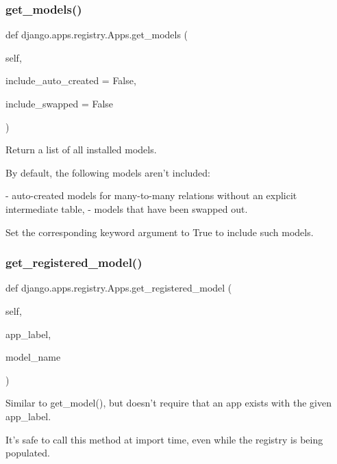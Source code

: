 \subsubsection{\texorpdfstring{get\+\_\+models()}{get\_models()}}
{\footnotesize\ttfamily def django.\+apps.\+registry.\+Apps.\+get\+\_\+models (\begin{DoxyParamCaption}\item[{}]{self,  }\item[{}]{include\+\_\+auto\+\_\+created = {\ttfamily False},  }\item[{}]{include\+\_\+swapped = {\ttfamily False} }\end{DoxyParamCaption})}

\begin{DoxyVerb}Return a list of all installed models.

By default, the following models aren't included:

- auto-created models for many-to-many relations without
  an explicit intermediate table,
- models that have been swapped out.

Set the corresponding keyword argument to True to include such models.
\end{DoxyVerb}
 \mbox{\label{classdjango_1_1apps_1_1registry_1_1_apps_a1f7538579bf34258180bf6ec39e3ad40}} 
\subsubsection{\texorpdfstring{get\+\_\+registered\+\_\+model()}{get\_registered\_model()}}
{\footnotesize\ttfamily def django.\+apps.\+registry.\+Apps.\+get\+\_\+registered\+\_\+model (\begin{DoxyParamCaption}\item[{}]{self,  }\item[{}]{app\+\_\+label,  }\item[{}]{model\+\_\+name }\end{DoxyParamCaption})}

\begin{DoxyVerb}Similar to get_model(), but doesn't require that an app exists with
the given app_label.

It's safe to call this method at import time, even while the registry
is being populated.
\end{DoxyVerb}
 \mbox{\label{classdjango_1_1apps_1_1registry_1_1_apps_a33919f7ae3592674248f55f4c2ac9cc1}} 
